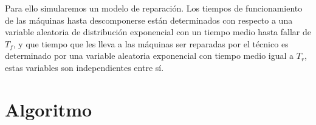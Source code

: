 \documentclass[10pt,a4paper]{article} %
\begin{document}
                                                                                Para ello simularemos un modelo de reparaci\'on. Los tiempos de funcionamiento de las m\'aquinas hasta descomponerse est\'an determinados con respecto a una variable aleatoria de distribuci\'on exponencial con un tiempo medio hasta fallar de $T_f$, y que tiempo que les lleva a las m\'aquinas ser reparadas por el t\'ecnico es determinado por una variable aleatoria exponencial con tiempo medio igual
                                                                                a $T_r$, estas variables son independientes entre s\'i.
                                                                                    
                                                                                        \newpage
                                                                                            \section{Algoritmo}
\end{document}
